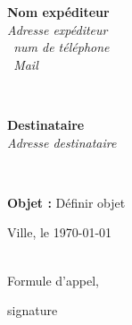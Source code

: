 \documentclass[a4paper,sans,12pt]{article}
\def\interligne{1}%
\def\lieu{Ville}
\def\signature{signature}
\def\expediteur{Nom expéditeur}
\def\adresseExpediteur{Adresse expéditeur }
\def\mail{Mail}
\def\mobile{num de téléphone}
\def\fixe{num tel fixe}
\def\destinataire{Destinataire }
\def\adresseDestinataire{ Adresse destinataire}
\def\objet{Définir objet }
\def\formuleAppel{Formule d'appel}
\begin{document}
%
\begin{minipage}[t]{.6\textwidth}
    \raggedright
    {\bfseries \expediteur}\\[.35ex]
    \small\itshape
    \adresseExpediteur\\
    \Mobilefone~\mobile\\
    \Letter~\mail
\end{minipage}\\[1em]
\hfill
\begin{minipage}[t]{1\textwidth}
    \raggedleft
    {\bfseries \destinataire}\\[.35ex]
    \small\itshape
    \adresseDestinataire\\
\end{minipage}\\[2em]
%
\begin{flushleft}
\textbf{Objet : }{\normalsize \objet }
\end{flushleft}
%
\hfill
%
\begin{minipage}[t]{1\textwidth}
    \raggedleft
    \lieu, le \today
\end{minipage}\\[3em]
%
\formuleAppel,\\[0.2em]
{\setlength{\baselineskip}{\interligne\baselineskip} %
    \lipsum[1-3]
\par} %
\vspace*{0.4cm}
\raggedleft 
\signature
\end{document}
